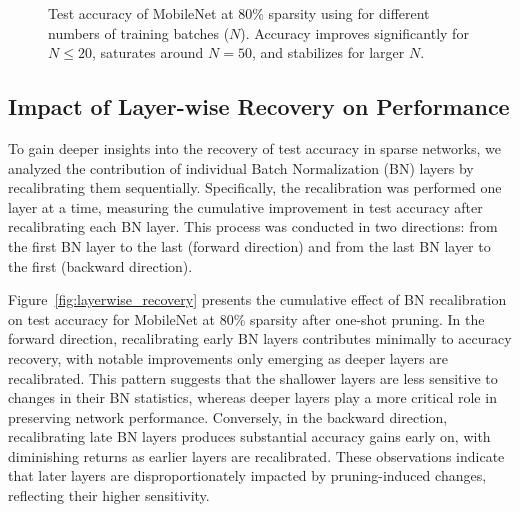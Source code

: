 \begin{figure}[t]
\centering
{}
\caption{Test accuracy of MobileNet at 80\% sparsity using \REFLOW{} for different numbers of training batches (\(N\)). Accuracy improves significantly for \(N \leq 20\), saturates around \(N = 50\), and stabilizes for larger \(N\).}\label{fig:mobnet_accuracy_batches}
\end{figure}


\subsection{Impact of Layer-wise Recovery on Performance}\label{sec:Ablation_layerwise}

To gain deeper insights into the recovery of test accuracy in sparse networks, we analyzed the contribution of individual Batch Normalization (BN) layers by recalibrating them sequentially. Specifically, the recalibration was performed one layer at a time, measuring the cumulative improvement in test accuracy after recalibrating each BN layer. This process was conducted in two directions: from the first BN layer to the last (forward direction) and from the last BN layer to the first (backward direction).

Figure~\ref{fig:layerwise_recovery} presents the cumulative effect of BN recalibration on test accuracy for MobileNet at 80\% sparsity after one-shot pruning. In the forward direction, recalibrating early BN layers contributes minimally to accuracy recovery, with notable improvements only emerging as deeper layers are recalibrated. This pattern suggests that the shallower layers are less sensitive to changes in their BN statistics, whereas deeper layers play a more critical role in preserving network performance. Conversely, in the backward direction, recalibrating late BN layers produces substantial accuracy gains early on, with diminishing returns as earlier layers are recalibrated. These observations indicate that later layers are disproportionately impacted by pruning-induced changes, reflecting their higher sensitivity.

